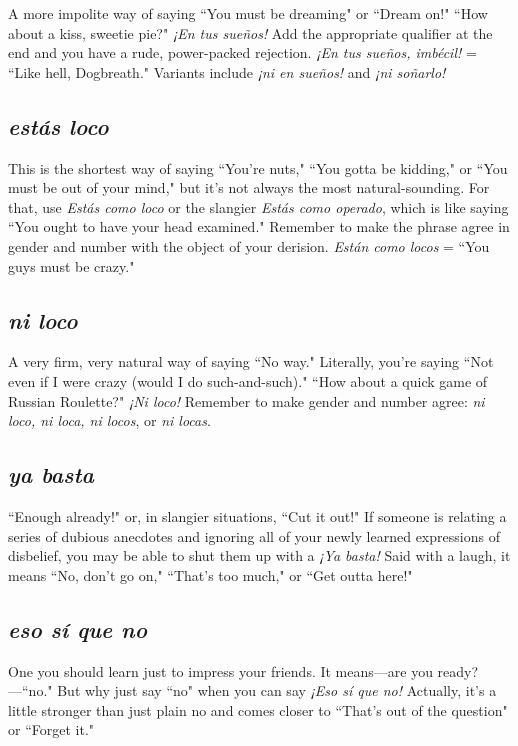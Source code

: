 A more impolite way of saying ``You must be dreaming" or
``Dream on!" ``How about a kiss, sweetie pie?" \emph{¡En tus sueños!} Add the
appropriate qualifier at the end and you have a rude, power-packed rejection. \emph{¡En tus sueños, imbécil!} = ``Like hell, Dogbreath." Variants
include \emph{¡ni en sueños!} and \emph{¡ni soñarlo!}

\subsection{\emph{estás loco}}

This is the shortest way of saying ``You're nuts," ``You gotta be
kidding," or ``You must be out of your mind," but it's not always the
most natural-sounding. For that, use \emph{Estás como loco} or the slangier
\emph{Estás como operado}, which is like saying ``You ought to have your
head examined." Remember to make the phrase agree in gender and
number with the object of your derision. \emph{Están como locos} = ``You
guys must be crazy."

\subsection{\emph{ni loco}}

A very firm, very natural way of saying ``No way." Literally,
you're saying ``Not even if I were crazy (would I do such-and-such)."
``How about a quick game of Russian Roulette?" \emph{¡Ni loco!} Remember to make gender and number agree: \emph{ni loco, ni loca, ni locos}, or
\emph{ni locas}.

\subsection{\emph{ya basta}}

``Enough already!" or, in slangier situations, ``Cut it out!" If
someone is relating a series of dubious anecdotes and ignoring all of
your newly learned expressions of disbelief, you may be able to shut
them up with a \emph{¡Ya basta!} Said with a laugh, it means ``No, don't go
on," ``That's too much," or ``Get outta here!"

\subsection{\emph{eso sí que no}}

One you should learn just to impress your friends. It means---are you ready?---``no." But why just say ``no" when you can say \emph{¡Eso sí
que no!} Actually, it's a little stronger than just plain no and comes
closer to ``That's out of the question" or ``Forget it."

